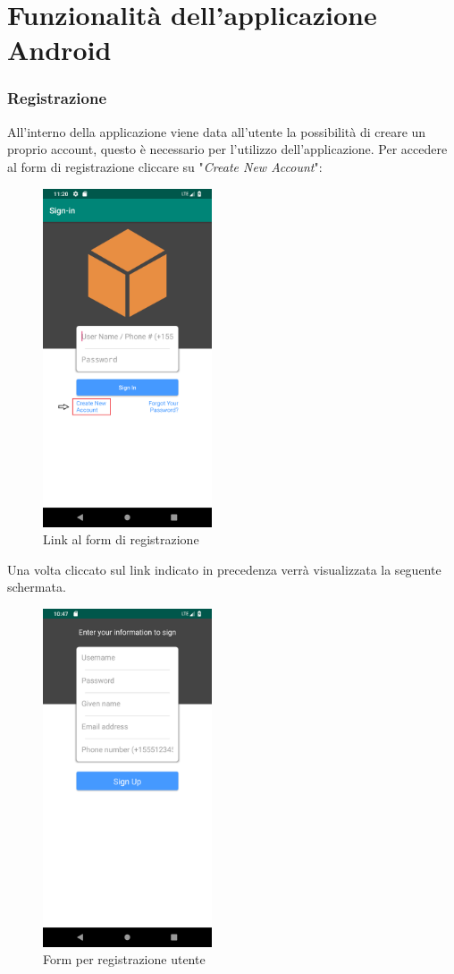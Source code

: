 \section{Funzionalità dell'applicazione  Android}
\label{sec:sec_funzionalita_applicazione}
\subsubsection{Registrazione}
\label{sec:funzionalita_applicazione_registrazione}
All'interno della applicazione viene data all'utente la possibilità di creare un proprio account, questo è necessario per l'utilizzo dell'applicazione. Per accedere al form di registrazione cliccare su "\textit{Create New Account}":
\begin{figure}[H]
	\centering
	\includegraphics[width=5cm]{../includes/pics/app_registration_form_1.png}
	\caption{\label{fig:app_registration_form_1}Link al form di registrazione}
\end{figure}
Una volta cliccato sul link indicato in precedenza verrà visualizzata la seguente schermata.
\begin{figure}[H]
	\centering
	\includegraphics[width=5cm]{../includes/pics/app_registration_form.png}
	\caption{\label{fig:app_registration_form}Form per registrazione utente}
\end{figure}
